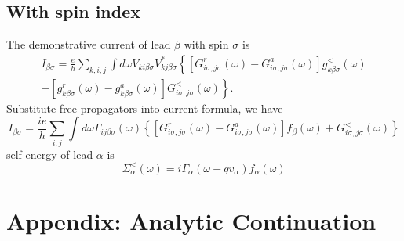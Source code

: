 \documentclass[aps,prb,superscriptaddress]{revtex4-2}
\begin{document}
\subsection{With spin index}
The demonstrative current of lead $\beta$ with spin $\sigma$ is~\cite{CaoZhan}
\begin{equation}
\begin{array}{r}
I_{\beta \sigma}=\frac{e}{h} \sum_{k, i, j} \int d \omega V_{k i \beta \sigma} V_{k j \beta \sigma}^{*}\left\{\left[G_{i \sigma, j \sigma}^{r}(\omega)-G_{i \sigma, j \sigma}^{a}(\omega)\right] g_{k \beta \sigma}^{<}(\omega)\right. \\
\left.-\left[g_{k \beta \sigma}^{r}(\omega)-g_{k \beta \sigma}^{a}(\omega)\right] G_{i \sigma, j \sigma}^{<}(\omega)\right\}.
\end{array}
\end{equation}
Substitute free propagators into current formula, we have
\begin{equation}
I_{\beta \sigma}=\frac{i e}{h} \sum_{i, j} \int d \omega \Gamma_{i j \beta \sigma}(\omega)\left\{\left[G_{i \sigma, j \sigma}^{r}(\omega)-G_{i \sigma, j \sigma}^{a}(\omega)\right] f_{\beta}(\omega)+G_{i \sigma, j \sigma}^{<}(\omega)\right\}
\end{equation}
self-energy of lead $\alpha$ is
\begin{equation}
\Sigma_{\alpha}^{<}(\omega)=i \Gamma_{\alpha}\left(\omega-q v_{\alpha}\right) f_{\alpha}(\omega)
\end{equation}


\clearpage
\section{Appendix: Analytic Continuation}
\end{document}
